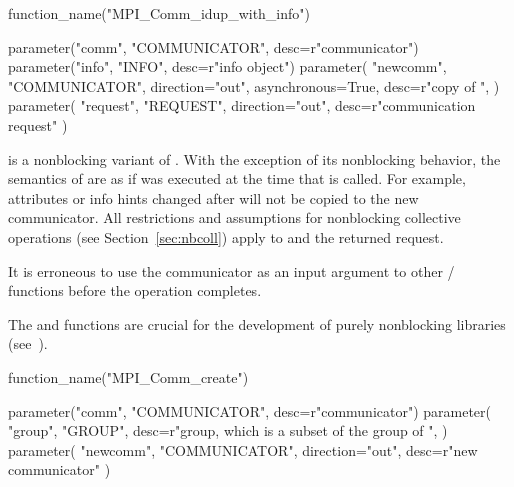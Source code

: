 %
\begin{mpi-binding}
    function_name("MPI_Comm_idup_with_info")
    
    parameter("comm", "COMMUNICATOR", desc=r"communicator")
    parameter("info", "INFO", desc=r"info object")
    parameter(
        "newcomm",
        "COMMUNICATOR",
        direction="out",
        asynchronous=True,
        desc=r"copy of ",
    )
    parameter(
        "request", "REQUEST", direction="out", desc=r"communication request"
    )
\end{mpi-binding}

 is a nonblocking variant of
. With the exception of its nonblocking behavior, the semantics of
 are as if
 was executed at the time that
 is called. For example, attributes or
info hints changed after  will not be
copied to the new communicator. All restrictions and assumptions for
nonblocking collective operations (see Section~\ref{sec:nbcoll}) apply to
 and the returned request.

It is erroneous to use the communicator  as an input argument
to other \MPI/ functions before the 
operation completes.

\begin{rationale}
The  and 
functions are crucial for the development of purely nonblocking libraries
(see~\cite{DBLP:conf/pvm/HoeflerS11}).
\end{rationale}

%
\begin{mpi-binding}
    function_name("MPI_Comm_create")
    
    parameter("comm", "COMMUNICATOR", desc=r"communicator")
    parameter(
        "group",
        "GROUP",
        desc=r"group, which is a subset of the group of ",
    )
    parameter(
        "newcomm", "COMMUNICATOR", direction="out", desc=r"new communicator"
    )
\end{mpi-binding}

